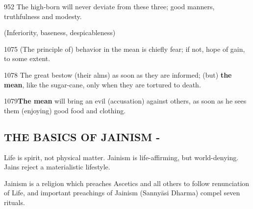 952 \endnote{}The high-born will never deviate from these three; good manners, truthfulness and modesty. 

 (Inferiority, baseness, despicableness)

1075\endnote{} (The principle of) behavior in the mean is chiefly fear; if not, hope of gain, to some extent. 

1078\endnote{} The great bestow (their alms) as soon as they are informed; (but) \textbf{the mean}, like the sugar-cane, only when they are tortured to death. 

1079\endnote{}\textbf{The mean} will bring an evil (accusation) against others, as soon as he sees them (enjoying) good food and clothing.


\subsection*{THE BASICS OF JAINISM - }

Life is spirit, not physical matter. Jainism is life-affirming, but world-denying. Jains reject a materialistic lifestyle.

Jainism is a religion which preaches Ascetics and all others to follow renunciation of Life, and important preachings of Jainism (Sannyāsi Dharma) compel seven rituals.

